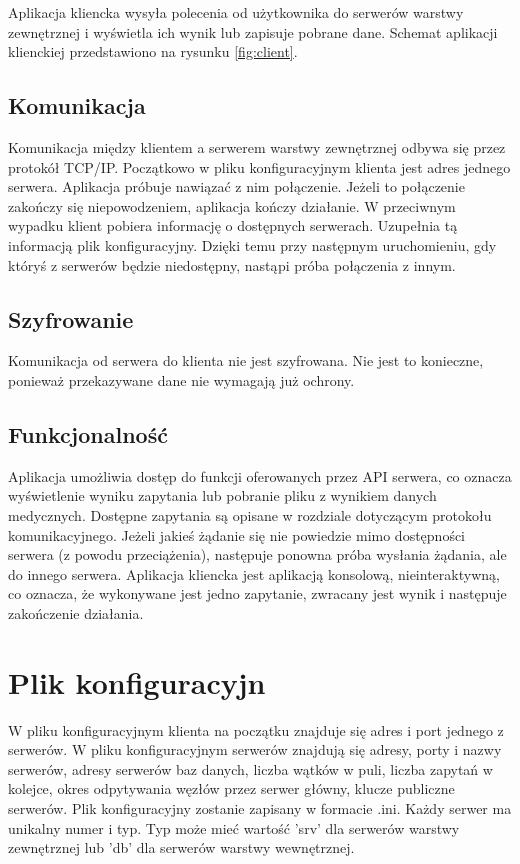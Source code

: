 Aplikacja kliencka wysyła polecenia od użytkownika do serwerów warstwy zewnętrznej i wyświetla ich wynik lub zapisuje pobrane dane. Schemat aplikacji klienckiej przedstawiono na rysunku \ref{fig:client}.

\subsection{Komunikacja}
Komunikacja między klientem a serwerem warstwy zewnętrznej odbywa się przez protokół TCP/IP. Początkowo w pliku konfiguracyjnym klienta jest adres jednego serwera. Aplikacja próbuje nawiązać z nim połączenie. Jeżeli to połączenie zakończy się niepowodzeniem, aplikacja kończy działanie. W przeciwnym wypadku klient pobiera informację o dostępnych serwerach. Uzupełnia tą informacją plik konfiguracyjny. Dzięki temu przy następnym uruchomieniu, gdy któryś z serwerów będzie niedostępny, nastąpi próba połączenia z innym.

\subsection{Szyfrowanie}
Komunikacja od serwera do klienta nie jest szyfrowana. Nie jest to konieczne, ponieważ przekazywane dane nie wymagają już ochrony.

\subsection{Funkcjonalność}
Aplikacja umożliwia dostęp do funkcji oferowanych przez API serwera, co oznacza wyświetlenie wyniku zapytania lub pobranie pliku z wynikiem danych medycznych. Dostępne zapytania są opisane w rozdziale dotyczącym protokołu komunikacyjnego. Jeżeli jakieś żądanie się nie powiedzie mimo dostępności serwera (z powodu przeciążenia), następuje ponowna próba wysłania żądania, ale do innego serwera.
Aplikacja kliencka jest aplikacją konsolową, nieinteraktywną, co oznacza, że wykonywane jest jedno zapytanie, zwracany jest wynik i następuje zakończenie działania.
\section{Plik konfiguracyjn}

W pliku konfiguracyjnym klienta na początku znajduje się adres i port jednego z serwerów.
W pliku konfiguracyjnym serwerów znajdują się adresy, porty i nazwy serwerów, adresy serwerów baz danych, liczba wątków w puli, liczba zapytań w kolejce, okres odpytywania węzłów przez serwer główny, klucze publiczne serwerów.
Plik konfiguracyjny zostanie zapisany w formacie .ini.
Każdy serwer ma unikalny numer i typ. Typ może mieć wartość 'srv' dla serwerów warstwy zewnętrznej lub 'db' dla serwerów warstwy wewnętrznej.

